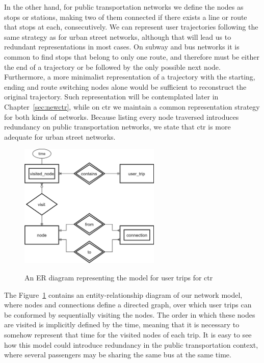 	In the other hand, for public transportation networks we define the nodes as stops or stations, making two of them connected if there exists a line or route that stops at each, consecutively. We can represent user trajectories following the same strategy as for urban street networks, although that will lead us to redundant representations in most cases. On subway and bus networks it is common to find stops that belong to only one route, and therefore must be either the end of a trajectory or be followed by the only possible next node. Furthermore, a more minimalist representation of a trajectory with the starting, ending and route switching nodes alone would be sufficient to reconstruct the original trajectory. Such representation will be contemplated later in Chapter~\ref{sec:newctr}, while on \gls{ctr} we maintain a common representation strategy for both kinds of networks. Because listing every node traversed introduces redundancy on public transportation networks, we state that \gls{ctr} is more adequate for urban street networks.
	
	\begin{figure}[ht]
		\begin{center}
			{\includegraphics[width=0.6\textwidth]{figures/street_er.png}}
		\end{center}
		\caption{An ER diagram representing the model for user trips for \acrshort{ctr}}
		\label{fig:street_er}
	\end{figure}
    
    The Figure~\ref{fig:street_er} contains an entity-relationship diagram of our network model, where nodes and connections define a directed graph, over which user trips can be conformed by sequentially visiting the nodes. The order in which these nodes are visited is implicitly defined by the time, meaning that it is necessary to somehow represent that time for the visited nodes of each trip.
    It is easy to see how this model could introduce redundancy in the public transportation context, where several passengers may be sharing the same bus at the same time.
	
